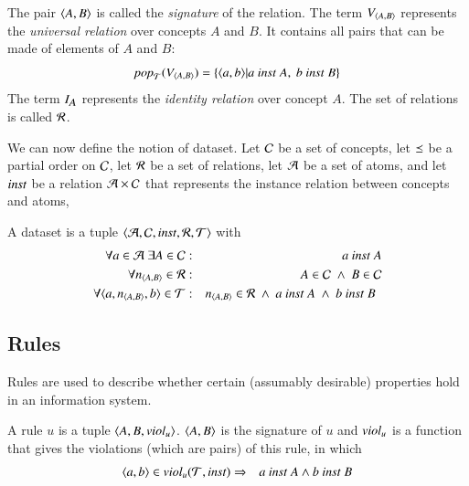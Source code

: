 \documentclass{elsarticle}
\begin{document}
   The pair $\langle{A},{B}\rangle$ is called the \emph{signature} of the relation.
   The term $V_{\langle{A},{B}\rangle}$ represents the \emph{universal relation} over concepts $A$ and $B$.
   It contains all pairs that can be made of elements of $A$ and $B$:
\[\text{\it pop\/}_{\mathcal{T}}(V_{\langle{A},{B}\rangle}) = \{ \langle{a},{b}\rangle| a\ \text{\it inst\/}\ A,\ b\ \text{\it inst\/}\ B \}\]
   The term $I_{\text{\it \small A\/}}$ represents the \emph{identity relation} over concept $A$.
   The set of relations is called $\mathcal{R}$.
   
   We can now define the notion of dataset.
   Let   $\mathcal{C}$ be a set of concepts,
   let $\preceq$ be a partial order on $\mathcal{C}$,
   let $\mathcal{R}$ be a set of relations,
   let $\mathcal{A}$ be a set of atoms,
   and let $\text{\it inst\/}$ be a relation $\mathcal{A}\times\mathcal{C}$ that represents the instance relation between concepts and atoms,
\begin{definition}[dataset]
   \label{def:dataset}
   \item A dataset is a tuple $\langle\mathcal{A},\mathcal{C},\text{\it inst\/},\mathcal{R},\mathcal{T}\rangle$ with
   \begin{eqnarray}
      \forall a\in\atoms\ \exists A\in\concepts&:&a\ \inst\ A\\
      \forall \declare{n}{A}{B}\in\rels&:&A\in\concepts\ \wedge\ B\in\concepts\\
      \forall\triple{a}{\declare{n}{A}{B}}{b}\in\triples&:&\begin{array}[t]{@{}l}\declare{n}{A}{B}\in\rels\ \wedge\ a\ \inst\ A\ \wedge\ b\ \inst\ B\end{array}
   \end{eqnarray}
\end{definition}

\subsection{Rules}
\label{sct:Rules}
   Rules are used to describe whether certain (assumably desirable) properties hold in an information system.

\begin{definition}[rule]
   \label{def:rule}
   \item A rule $u$ is a tuple $\langle A,B,\text{\it viol\/}_u\rangle$.
   $\langle{A},{B}\rangle$ is the signature of $u$ and
   $\text{\it viol\/}_u$ is a function that gives the violations (which are pairs) of this rule,
   in which
\begin{eqnarray}
   \langle{a},{b}\rangle\in\text{\it viol\/}_{u}(\mathcal{T},\text{\it inst\/})&\Rightarrow&a\ \text{\it inst\/}\ A\wedge b\ \text{\it inst\/}\ B
\end{eqnarray}
\end{definition}
\end{document}
